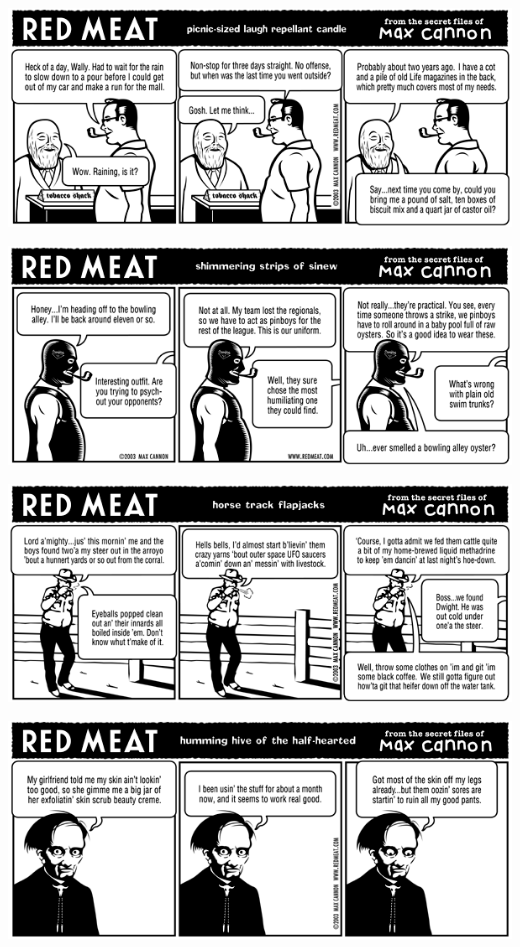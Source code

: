 \documentclass[a4paper,twoside,11pt]{article}
\begin{document}
\includegraphics[width=\textwidth]{redmeat_2003-06-10.png}



\includegraphics[width=\textwidth]{redmeat_2003-06-17.png}



\includegraphics[width=\textwidth]{redmeat_2003-06-24.png}



\includegraphics[width=\textwidth]{redmeat_2003-07-01.png}
\end{document}
